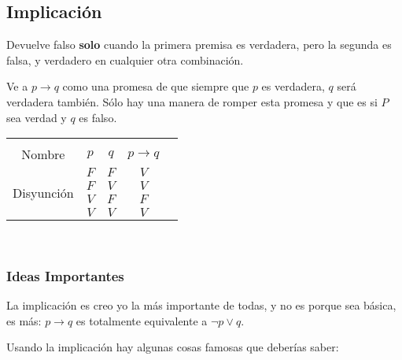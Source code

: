 \documentclass[12pt, fleqn]{report}                             %
\begin{document}
            \clearpage
            \subsection{Implicación}

                Devuelve falso \textbf{solo} cuando la primera premisa es verdadera, pero la 
                segunda es falsa, y verdadero en cualquier otra combinación.

                Ve a $p \to q$ como una promesa de que siempre que $p$ es verdadera, $q$ será verdadera también.
                Sólo hay una manera de romper esta promesa y que es si $P$ sea verdad y $q$ es falso.\\


                \begin{tabular}{ |c|c|c|c|c| } 
                    \hline &&&\\
                    \large{Nombre} & $p$ & $q$ & $p \to q$ \\[0.5em]
                    \hline
                    \multirow{4}{5em}{Disyunción}
                    & $F$ & $F$ & $V$ \\ \cline{2-4}
                    & $F$ & $V$ & $V$ \\ \cline{2-4}
                    & $V$ & $F$ & $F$ \\ \cline{2-4}
                    & $V$ & $V$ & $V$ \\ 
                    \hline
                \end{tabular}\\[1.0em]

                \subsubsection*{Ideas Importantes}

                    La implicación es creo yo la más importante de todas, y no es porque sea básica, 
                    es más: $p \to q$ es totalmente equivalente a $\lnot p \lor q$.

                    Usando la implicación hay algunas cosas famosas que deberías saber:
\end{document}
